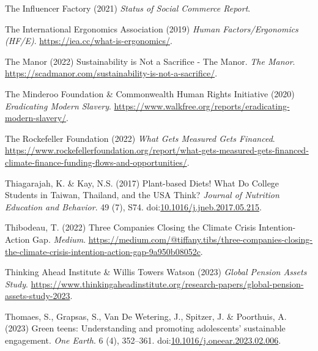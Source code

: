 \documentclass[
  letterpaper,
  DIV=11,
  numbers=noendperiod]{scrartcl}
\newlength{\cslhangindent}
\newenvironment{CSLReferences}[2] %
 {\begin{list}{}{%
  \setlength{\itemindent}{0pt}
  \setlength{\leftmargin}{0pt}
  \setlength{\parsep}{0pt}
  \ifodd #1
   \setlength{\leftmargin}{\cslhangindent}
   \setlength{\itemindent}{-1\cslhangindent}
  \fi
  \setlength{\itemsep}{#2\baselineskip}}}
 {\end{list}}
\begin{document}
\begin{CSLReferences}{0}{1}
The Influencer Factory (2021) \emph{Status of {Social Commerce Report}}.

The International Ergonomics Association (2019) \emph{Human
{Factors}/{Ergonomics} ({HF}/{E})}.
\url{https://iea.cc/what-is-ergonomics/}.

The Manor (2022) Sustainability is {Not} a {Sacrifice} - {The Manor}.
\emph{The Manor}.
\url{https://scadmanor.com/sustainability-is-not-a-sacrifice/}.

The Minderoo Foundation \& Commonwealth Human Rights Initiative (2020)
\emph{Eradicating {Modern Slavery}}.
\url{https://www.walkfree.org/reports/eradicating-modern-slavery/}.

The Rockefeller Foundation (2022) \emph{What {Gets Measured Gets
Financed}}.
\url{https://www.rockefellerfoundation.org/report/what-gets-measured-gets-financed-climate-finance-funding-flows-and-opportunities/}.

Thiagarajah, K. \& Kay, N.S. (2017) Plant-based {Diets}! {What Do
College Students} in {Taiwan}, {Thailand}, and the {USA Think}?
\emph{Journal of Nutrition Education and Behavior}. 49 (7), S74.
doi:\href{https://doi.org/10.1016/j.jneb.2017.05.215}{10.1016/j.jneb.2017.05.215}.

Thibodeau, T. (2022) Three {Companies Closing} the {Climate Crisis
Intention-Action Gap}. \emph{Medium}.
\url{https://medium.com/@tiffany.tibs/three-companies-closing-the-climate-crisis-intention-action-gap-9a950b08052c}.

Thinking Ahead Institute \& Willis Towers Watson (2023) \emph{Global
{Pension Assets Study}}.
\url{https://www.thinkingaheadinstitute.org/research-papers/global-pension-assets-study-2023}.

Thomaes, S., Grapsas, S., Van De Wetering, J., Spitzer, J. \& Poorthuis,
A. (2023) Green teens: {Understanding} and promoting adolescents'
sustainable engagement. \emph{One Earth}. 6 (4), 352--361.
doi:\href{https://doi.org/10.1016/j.oneear.2023.02.006}{10.1016/j.oneear.2023.02.006}.


\end{CSLReferences}
\end{document}
